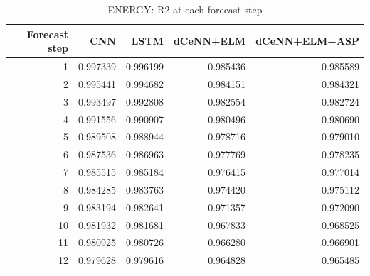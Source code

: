 \begin{table}
\caption{ENERGY: R2 at each forecast step}
\begin{tabular}{rrrrr}
\toprule
Forecast step & CNN & LSTM & dCeNN+ELM & dCeNN+ELM+ASP \\
\midrule
1 & 0.997339 & 0.996199 & 0.985436 & 0.985589 \\
2 & 0.995441 & 0.994682 & 0.984151 & 0.984321 \\
3 & 0.993497 & 0.992808 & 0.982554 & 0.982724 \\
4 & 0.991556 & 0.990907 & 0.980496 & 0.980690 \\
5 & 0.989508 & 0.988944 & 0.978716 & 0.979010 \\
6 & 0.987536 & 0.986963 & 0.977769 & 0.978235 \\
7 & 0.985515 & 0.985184 & 0.976415 & 0.977014 \\
8 & 0.984285 & 0.983763 & 0.974420 & 0.975112 \\
9 & 0.983194 & 0.982641 & 0.971357 & 0.972090 \\
10 & 0.981932 & 0.981681 & 0.967833 & 0.968525 \\
11 & 0.980925 & 0.980726 & 0.966280 & 0.966901 \\
12 & 0.979628 & 0.979616 & 0.964828 & 0.965485 \\
\bottomrule
\end{tabular}
\end{table}

